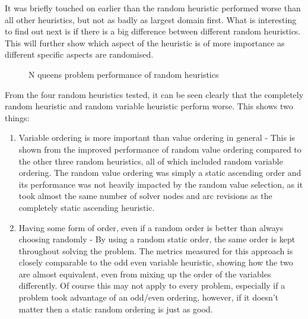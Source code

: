 \documentclass{article}
\begin{document}
\noindent
It was briefly touched on earlier than the random heuristic performed worse than all other heuristics, but not as badly as largest domain first. What is interesting to find out next is if there is a big difference between different random heuristics. This will further show which aspect of the heuristic is of more importance as different specific aspects are randomised. 

\begin{figure}[H]
\centering
{}
\caption{N queens problem performance of random heuristics}
\end{figure}
\noindent
From the four random heuristics tested, it can be seen clearly that the completely random heuristic and random variable heuristic perform worse. This shows two things:
\begin{enumerate}
\item Variable ordering is more important than value ordering in general - This is shown from the improved performance of random value ordering compared to the other three random heuristics, all of which included random variable ordering. The random value ordering was simply a static ascending order and its performance was not heavily impacted by the random value selection, as it took almost the same number of solver nodes and arc revisions as the completely static ascending heuristic. 
\item Having some form of order, even if a random order is better than always choosing randomly - By using a random static order, the same order is kept throughout solving the problem. The metrics measured for this approach is closely comparable to the odd even variable heuristic, showing how the two are almost equivalent, even from mixing up the order of the variables differently. Of course this may not apply to every problem, especially if a problem took advantage of an odd/even ordering, however, if it doesn't matter then a static random ordering is just as good. 
\end{enumerate}
\end{document}
